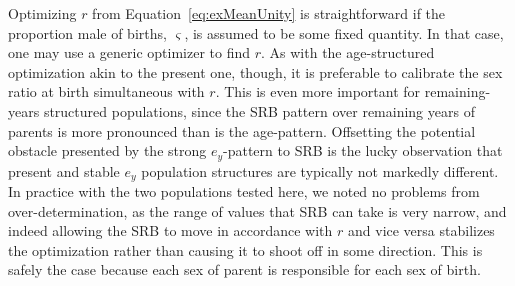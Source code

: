 
Optimizing $r$ from Equation~\eqref{eq:exMeanUnity} is straightforward if the
proportion male of births, $\varsigma$, is assumed to be some fixed quantity.
In that case, one may use a generic optimizer to find $r$. As with the
age-structured optimization akin to the present one, though, it is preferable to
calibrate the sex ratio at birth simultaneous with $r$. This is even more
important for remaining-years structured populations, since the SRB pattern over
remaining years of parents is more pronounced than is the age-pattern.
Offsetting the potential obstacle presented by the strong $e_y$-pattern to SRB
is the lucky observation that present and stable $e_y$ population structures are
typically not markedly different. In practice with the two populations tested
here, we noted no problems from over-determination, as the range of values
that SRB can take is very narrow, and indeed allowing the SRB to move in accordance
with $r$ and vice versa stabilizes the optimization rather than causing it to
shoot off in some direction. This is safely the case because each sex of parent
is responsible for each sex of birth.


